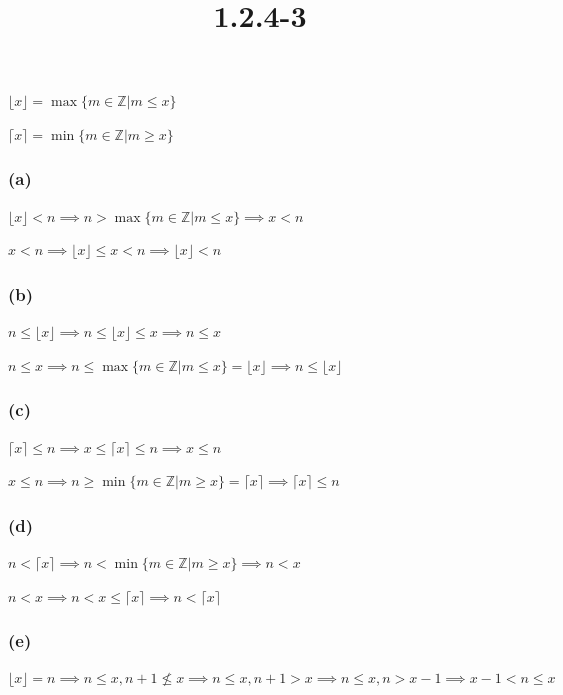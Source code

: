\documentclass{article}
\title{1.2.4-3}
\begin{document}
\maketitle

$\lfloor x \rfloor = \max \{ m \in \mathbb{Z} | m \leq x \}$

$\lceil x \rceil = \min \{ m \in \mathbb{Z} | m \geq x \}$

\subsubsection*{(a)}

$\lfloor x \rfloor < n \implies n > \max \{ m \in \mathbb{Z} | m \leq x \}  \implies x < n$

$x < n \implies \lfloor x \rfloor \leq x < n \implies \lfloor x \rfloor < n$

\subsubsection*{(b)}

$n \leq \lfloor x \rfloor \implies n \leq \lfloor x \rfloor \leq x \implies n \leq x$

$n \leq x \implies n \leq \max \{ m \in \mathbb{Z} | m \leq x \} = \lfloor x \rfloor \implies n \leq \lfloor x \rfloor$

\subsubsection*{(c)}

$\lceil x \rceil \leq n \implies x \leq \lceil x \rceil \leq n \implies x \leq n$

$x \leq n \implies n \geq \min \{ m \in \mathbb{Z} | m \geq x \} = \lceil x \rceil \implies \lceil x \rceil \leq n$

\subsubsection*{(d)}

$n < \lceil x \rceil \implies n < \min \{ m \in \mathbb{Z} | m \geq x \} \implies n < x$

$n < x \implies n < x \leq \lceil x \rceil \implies n < \lceil x \rceil$

\subsubsection*{(e)}

$\lfloor x \rfloor = n \implies n \leq x, n + 1 \nleq x \implies n \leq x, n + 1 > x \implies n \leq x, n > x - 1 \implies x - 1 < n \leq x$
\end{document}
